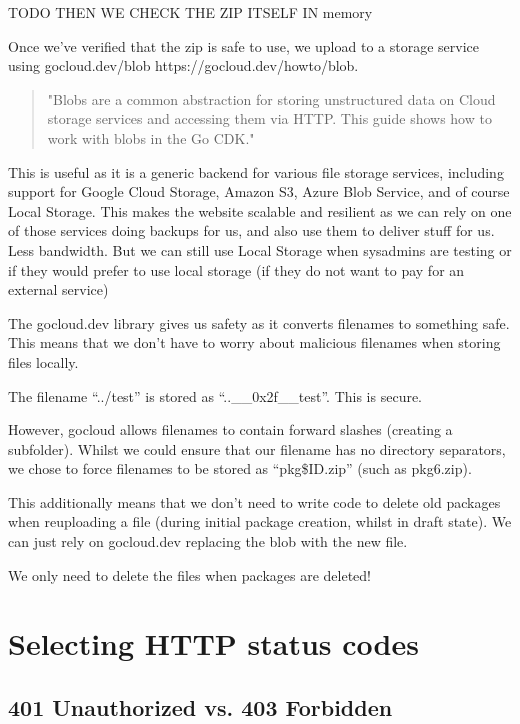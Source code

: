 \documentclass[bsc,frontabs,twoside,singlespacing,parskip,deptreport]{infthesis}     %
\begin{document}
TODO THEN WE CHECK THE ZIP ITSELF IN memory

Once we've verified that the zip is safe to use, we upload to a storage service using gocloud.dev/blob https://gocloud.dev/howto/blob.

\begin{quote}
  "Blobs are a common abstraction for storing unstructured data on Cloud storage services and accessing them via HTTP. This guide shows how to work with blobs in the Go CDK."
\end{quote}

This is useful as it is a generic backend for various file storage services, including support for Google Cloud Storage, Amazon S3, Azure Blob Service, and of course Local Storage. This makes the website scalable and resilient as we can rely on one of those services doing backups for us, and also use them to deliver stuff for us. Less bandwidth. But we can still use Local Storage when sysadmins are testing or if they would prefer to use local storage (if they do not want to pay for an external service)

The gocloud.dev library gives us safety as it converts filenames to something safe. This means that we don't have to worry about malicious filenames when storing files locally.

The filename ``../test'' is stored as ``..\_\_0x2f\_\_test''. This is secure.

However, gocloud allows filenames to contain forward slashes (creating a subfolder). Whilst we could ensure that our filename has no directory separators, we chose to force filenames to be stored as ``pkg\${ID}.zip'' (such as pkg6.zip).

This additionally means that we don't need to write code to delete old packages when reuploading a file (during initial package creation, whilst in draft state). We can just rely on gocloud.dev replacing the blob with the new file.

We only need to delete the files when packages are deleted!

\section{Selecting HTTP status codes}

\subsection{401 Unauthorized vs. 403 Forbidden}
\end{document}
